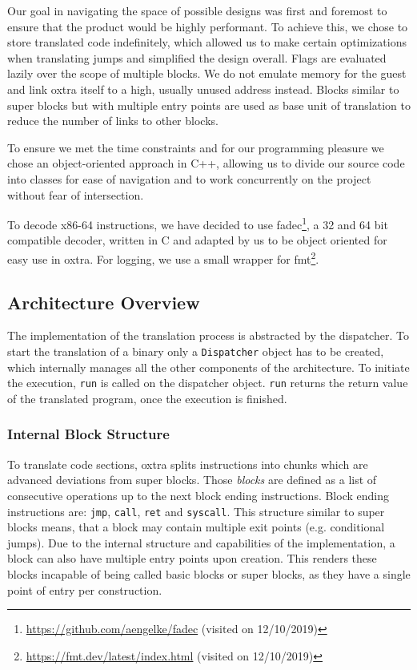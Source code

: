 Our goal in navigating the space of possible designs was first and foremost to ensure that the product would be highly performant. To achieve this, we chose to store translated code indefinitely, which allowed us to make certain optimizations when translating jumps and simplified the design overall. Flags are evaluated lazily over the scope of multiple blocks. We do not emulate memory for the guest and link oxtra itself to a high, usually unused address instead. Blocks similar to super blocks but with multiple entry points are used as base unit of translation to reduce the number of links to other blocks.

To ensure we met the time constraints and for our programming pleasure we chose an object-oriented approach in C++, allowing us to divide our source code into classes for ease of navigation and to work concurrently on the project without fear of intersection.

To decode x86-64 instructions, we have decided to use fadec\footnote{\url{https://github.com/aengelke/fadec} (visited on 12/10/2019)}, a 32 and 64 bit compatible decoder, written in C and adapted by us to be object oriented for easy use in oxtra. For logging, we use a small wrapper for fmt\footnote{\url{https://fmt.dev/latest/index.html} (visited on 12/10/2019)}.

\subsection{Architecture Overview}
	The implementation of the translation process is abstracted by the dispatcher. To start the translation of a binary only a \texttt{Dispatcher} object has to be created, which internally manages all the other components of the architecture. To initiate the execution, \texttt{run} is called on the dispatcher object. \texttt{run} returns the return value of the translated program, once the execution is finished.

	\subsubsection{Internal Block Structure}
	To translate code sections, oxtra splits instructions into chunks which are advanced deviations from super blocks. Those \emph{blocks} are defined as a list of consecutive operations up to the next block ending instructions. Block ending instructions are: \texttt{jmp}, \texttt{call}, \texttt{ret} and \texttt{syscall}. This structure similar to super blocks means, that a block may contain multiple exit points (e.g. conditional jumps). Due to the internal structure and capabilities of the implementation, a block can also have multiple entry points upon creation. This renders these blocks incapable of being called basic blocks or super blocks, as they have a single point of entry per construction.

